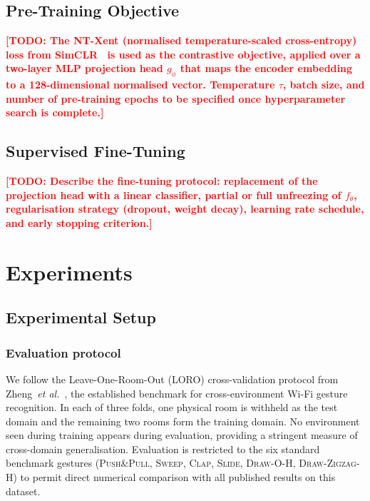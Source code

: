 \documentclass[journal]{IEEEtran}
\newcommand{\todo}[1]{\textcolor{red}{\textbf{[TODO: #1]}}}
\begin{document}
\subsection{Pre-Training Objective}
\label{sec:method:objective}

\todo{The NT-Xent (normalised temperature-scaled cross-entropy) loss
from SimCLR~\cite{chen2020simclr} is used as the contrastive
objective, applied over a two-layer MLP projection head $g_\phi$
that maps the encoder embedding to a 128-dimensional normalised
vector. Temperature $\tau$, batch size, and number of pre-training
epochs to be specified once hyperparameter search is complete.}

\subsection{Supervised Fine-Tuning}
\label{sec:method:finetuning}

\todo{Describe the fine-tuning protocol: replacement of the projection
head with a linear classifier, partial or full unfreezing of
$f_\theta$, regularisation strategy (dropout, weight decay), learning
rate schedule, and early stopping criterion.}

\section{Experiments}
\label{sec:experiments}

\subsection{Experimental Setup}
\label{sec:experiments:setup}

\subsubsection*{Evaluation protocol}
We follow the Leave-One-Room-Out (LORO) cross-validation protocol
from Zheng~\textit{et al.}~\cite{zheng2019widar3}, the established
benchmark for cross-environment Wi-Fi gesture recognition.
In each of three folds, one physical room is withheld as the test
domain and the remaining two rooms form the training domain.
No environment seen during training appears during evaluation,
providing a stringent measure of cross-domain generalisation.
Evaluation is restricted to the six standard benchmark gestures
(\textsc{Push\&Pull}, \textsc{Sweep}, \textsc{Clap}, \textsc{Slide},
\textsc{Draw-O-H}, \textsc{Draw-Zigzag-H}) to permit direct
numerical comparison with all published results on this dataset.
\end{document}
